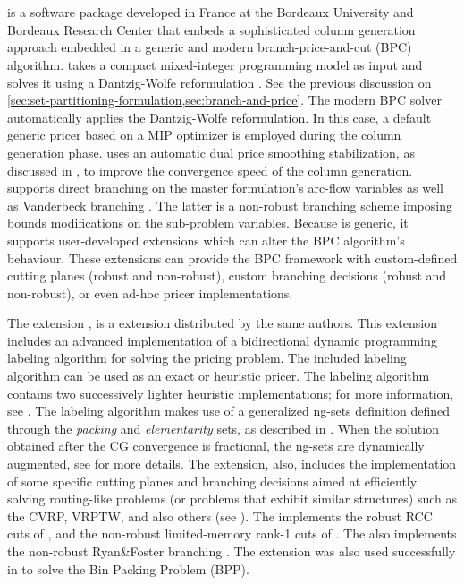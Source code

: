 \section{\bapcod{}}
\label{sec:results-bapcod}

\bapcod{} \parencite{sadykov2021} is a software package
developed in France at the Bordeaux University and Bordeaux Research Center
that embeds a sophisticated column generation approach
embedded in a generic and modern branch-price-and-cut (BPC) algorithm.
\bapcod{} takes a compact mixed-integer programming model as input
and solves it using a Dantzig-Wolfe reformulation \parencite{dantzig1960}.
See the previous discussion on \cref{sec:set-partitioning-formulation,sec:branch-and-price}.
The modern BPC solver automatically applies the Dantzig-Wolfe reformulation.
In this case, a default generic pricer based on a MIP optimizer
is employed during the column generation phase.
\bapcod{} uses an automatic dual price smoothing stabilization,
as discussed in \textcite{pessoa2018automation},
to improve the convergence speed of the column generation.
\bapcod{} supports direct branching on the master formulation's arc-flow variables
as well as Vanderbeck branching \parencite{vanderbeck2011}.
The latter is a non-robust branching scheme imposing bounds modifications on the sub-problem variables.
Because \bapcod{} is generic, it supports user-developed extensions
which can alter the BPC algorithm's behaviour.
These extensions can provide the BPC framework with
custom-defined cutting planes (robust and non-robust),
custom branching decisions (robust and non-robust),
or even ad-hoc pricer implementations.

The \vrpsolver{} extension \parencite{pessoa2020generic}, is
a \bapcod{} extension distributed by the same authors.
This extension includes an
advanced implementation of a bidirectional dynamic programming labeling algorithm
\parencite{sadykov2021bucket} for solving the pricing problem.
The included labeling algorithm
can be used as an exact or heuristic pricer.
The labeling algorithm contains two successively lighter heuristic implementations;
for more information, see \textcite{sadykov2021bucket}.
The labeling algorithm makes use of a generalized ng-sets definition \parencite{baldacci2011}
defined through the \textit{packing} and \textit{elementarity} sets,
as described in \textcite{pessoa2020generic}.
When the solution obtained after the CG convergence is fractional,
the ng-sets are dynamically augmented,
see \textcite{pessoa2020generic} for more details.
The \vrpsolver{} extension, also,
includes the implementation of some
specific cutting planes and branching decisions
aimed at efficiently solving routing-like problems
(or problems that exhibit similar structures)
such as the CVRP, VRPTW, and also others (see \cite{pessoa2020generic}).
The \vrpsolver{} implements the robust RCC cuts of \textcite{laporte1983},
and the non-robust limited-memory rank-1 cuts of \textcite{pecin2017improved}.
The \vrpsolver{} also implements the non-robust Ryan\&Foster branching \parencite{ryan1981integer}.
The \vrpsolver{} extension was also used successfully in \textcite{pessoa2020}
to solve the Bin Packing Problem (BPP).

